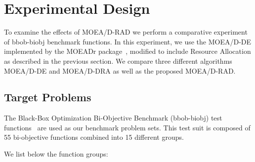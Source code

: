 \section{Experimental Design}

%

To examine the effects of MOEA/D-RAD we perform a comparative experiment of bbob-biobj benchmark functions. In this experiment, we use the MOEA/D-DE implemented by the MOEADr package~\cite{moeadr_package}, modified to include Resource Allocation as described in the previous section. We compare three different algorithms MOEA/D-DE and MOEA/D-DRA as well as the proposed MOEA/D-RAD.

\subsection{Target Problems}\label{target_problems}

The Black-Box Optimization Bi-Objective Benchmark (bbob-biobj) test functions~\cite{tusar2016coco} are used as our benchmark problem sets. This test suit is composed of 55 bi-objective functions combined into 15 different groups.

We list below the function groups:

